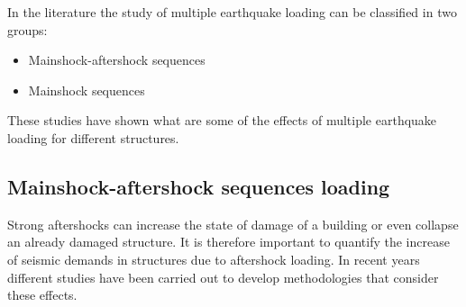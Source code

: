 In the literature the study of multiple earthquake loading can be classified in two groups:

\begin{itemize}
	\item Mainshock-aftershock sequences
	\item Mainshock sequences
\end{itemize}

These studies have shown what are some of the effects of multiple earthquake loading for different structures.

\subsection{Mainshock-aftershock sequences loading }

Strong aftershocks can increase the state of damage of a building or even collapse an already damaged structure. It is therefore important to quantify the increase of seismic demands in structures due to aftershock loading. In recent years different studies have been carried out to develop methodologies that consider these effects.


